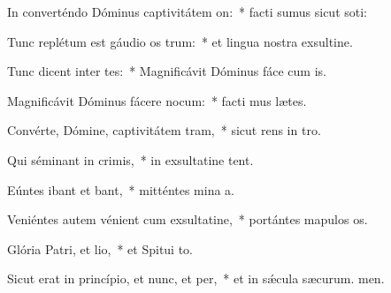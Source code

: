 \item In converténdo Dóminus captivitátem on:~* facti sumus sicut soti:
\item Tunc replétum est gáudio os trum:~* et lingua nostra exsultine.
\item Tunc dicent inter tes:~* Magnificávit Dóminus fáce cum is.
\item Magnificávit Dóminus fácere nocum:~* facti mus lætes.
\item Convérte, Dómine, captivitátem tram,~* sicut rens in tro.
\item Qui séminant in crimis,~* in exsultatine tent.
\item Eúntes ibant et bant,~* mitténtes mina a.
\item Veniéntes autem vénient cum exsultatine,~* portántes mapulos os.
\item Glória Patri, et lio,~* et Spitui to.
\item Sicut erat in princípio, et nunc, et per,~* et in sǽcula sæcurum. men.

